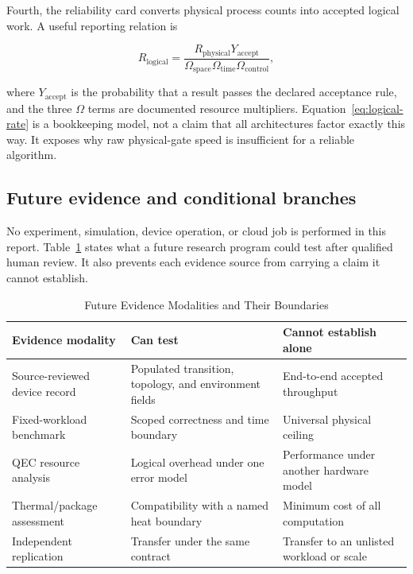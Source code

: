 \documentclass[conference]{IEEEtran}
\begin{document}
Fourth, the reliability card converts physical process counts into accepted
logical work. A useful reporting relation is

\begin{equation}
R_{\mathrm{logical}} =
\frac{R_{\mathrm{physical}}Y_{\mathrm{accept}}}
{\Omega_{\mathrm{space}}\Omega_{\mathrm{time}}\Omega_{\mathrm{control}}},
\label{eq:logical-rate}
\end{equation}

where \(Y_{\mathrm{accept}}\) is the probability that a result passes the
declared acceptance rule, and the three \(\Omega\) terms are documented
resource multipliers. Equation~\eqref{eq:logical-rate} is a bookkeeping
model, not a claim that all architectures factor exactly this way. It exposes
why raw physical-gate speed is insufficient for a reliable algorithm.

\subsection{Future evidence and conditional branches}

No experiment, simulation, device operation, or cloud job is performed in
this report. Table~\ref{tab:future} states what a future research program
could test after qualified human review. It also prevents each evidence source
from carrying a claim it cannot establish.

\begin{table}[t]
\caption{Future Evidence Modalities and Their Boundaries}
\label{tab:future}
\centering
\footnotesize
\begin{tabular}{p{}p{}p{}}
\toprule
Evidence modality & Can test & Cannot establish alone\\
\midrule
Source-reviewed device record & Populated transition, topology, and environment fields & End-to-end accepted throughput\\
Fixed-workload benchmark & Scoped correctness and time boundary & Universal physical ceiling\\
QEC resource analysis & Logical overhead under one error model & Performance under another hardware model\\
Thermal/package assessment & Compatibility with a named heat boundary & Minimum cost of all computation\\
Independent replication & Transfer under the same contract & Transfer to an unlisted workload or scale\\
\bottomrule
\end{tabular}
\end{table}
\end{document}

